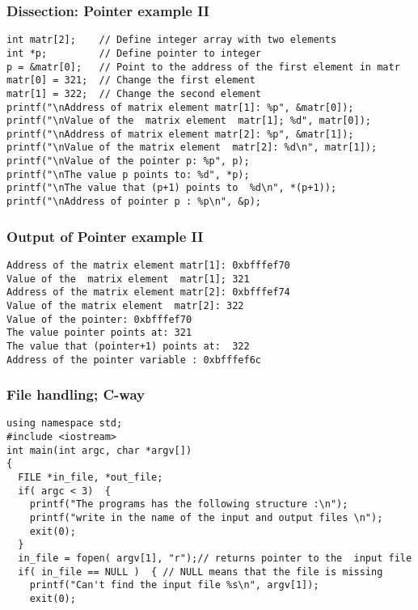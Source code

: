 \documentclass{beamer}
\newenvironment{block_mdfboxadmon}[1][]{\begin{block}{#1}}{\end{block}}
\begin{document}
\begin{frame}
\frametitle{Dissection: Pointer example II}

\begin{block_mdfboxadmon}[]
\begin{verbatim}
int matr[2];    // Define integer array with two elements
int *p;         // Define pointer to integer
p = &matr[0];   // Point to the address of the first element in matr
matr[0] = 321;  // Change the first element
matr[1] = 322;  // Change the second element
printf("\nAddress of matrix element matr[1]: %p", &matr[0]);
printf("\nValue of the  matrix element  matr[1]; %d", matr[0]);
printf("\nAddress of matrix element matr[2]: %p", &matr[1]);
printf("\nValue of the matrix element  matr[2]: %d\n", matr[1]);
printf("\nValue of the pointer p: %p", p);
printf("\nThe value p points to: %d", *p);
printf("\nThe value that (p+1) points to  %d\n", *(p+1));
printf("\nAddress of pointer p : %p\n", &p);
\end{verbatim}
\end{block_mdfboxadmon}
\end{frame}

\begin{frame}
\frametitle{Output of Pointer example II}

\begin{block_mdfboxadmon}[]
\begin{Verbatim}[numbers=none,fontsize=\fontsize{9pt}{9pt},baselinestretch=0.95]
Address of the matrix element matr[1]: 0xbfffef70
Value of the  matrix element  matr[1]; 321
Address of the matrix element matr[2]: 0xbfffef74
Value of the matrix element  matr[2]: 322
Value of the pointer: 0xbfffef70
The value pointer points at: 321
The value that (pointer+1) points at:  322
Address of the pointer variable : 0xbfffef6c
\end{Verbatim}
\end{block_mdfboxadmon}
\end{frame}

\begin{frame}
\frametitle{File handling; C-way}

\begin{verbatim}
using namespace std;
#include <iostream>
int main(int argc, char *argv[])
{
  FILE *in_file, *out_file;
  if( argc < 3)  {
    printf("The programs has the following structure :\n");
    printf("write in the name of the input and output files \n");
    exit(0);
  }
  in_file = fopen( argv[1], "r");// returns pointer to the  input file
  if( in_file == NULL )  { // NULL means that the file is missing
    printf("Can't find the input file %s\n", argv[1]);
    exit(0);
\end{verbatim}
\end{frame}
\end{document}
